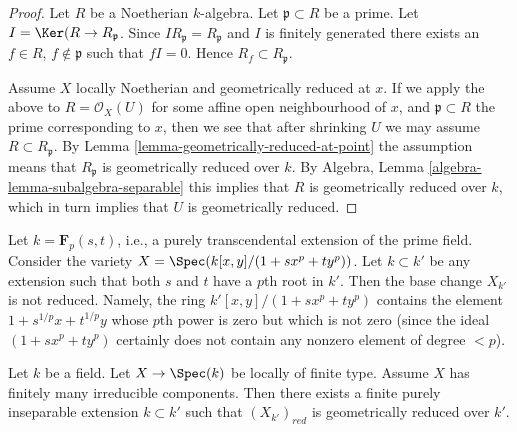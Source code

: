 \begin{proof}
Let $R$ be a Noetherian $k$-algebra.
Let $\mathfrak p \subset R$ be a prime.
Let $I = \Ker(R \to R_{\mathfrak p}$.
Since $IR_{\mathfrak p} = R_{\mathfrak p}$ and $I$ is finitely generated
there exists an $f \in R$, $f \not \in \mathfrak p$ such that $fI = 0$.
Hence $R_f \subset R_{\mathfrak p}$.

\medskip\noindent
Assume $X$ locally Noetherian and geometrically reduced at $x$.
If we apply the above to $R = \mathcal{O}_X(U)$ for some affine
open neighbourhood of $x$, and $\mathfrak p \subset R$ the prime
corresponding to $x$, then we see that after shrinking $U$ we may
assume $R \subset R_{\mathfrak p}$. By
Lemma \ref{lemma-geometrically-reduced-at-point} the assumption
means that $R_{\mathfrak p}$ is geometrically reduced over $k$.
By Algebra, Lemma \ref{algebra-lemma-subalgebra-separable}
this implies that $R$ is geometrically reduced over $k$, which
in turn implies that $U$ is geometrically reduced.
\end{proof}

\begin{example}
\label{example-not-geometrically-reduced}
Let $k = \mathbf{F}_p(s, t)$, i.e., a purely transcendental extension
of the prime field. Consider the variety
$X = \Spec(k[x, y]/(1 + sx^p + ty^p))$.
Let $k \subset k'$ be any extension such that
both $s$ and $t$ have a $p$th root in $k'$.
Then the base change $X_{k'}$ is not reduced.
Namely, the ring $k'[x, y]/(1 + s x^p + ty^p)$ contains the element
$1 + s^{1/p}x + t^{1/p}y$ whose $p$th power is zero but
which is not zero (since the ideal $(1 + sx^p + ty^p)$ certainly
does not contain any nonzero element of degree $< p$).
\end{example}

\begin{lemma}
\label{lemma-finite-extension-geometrically-reduced}
Let $k$ be a field.
Let $X \to \Spec(k)$ be locally of finite type.
Assume $X$ has finitely many irreducible components.
Then there exists a finite purely inseparable extension $k \subset k'$
such that $(X_{k'})_{red}$ is geometrically reduced over $k'$.
\end{lemma}

